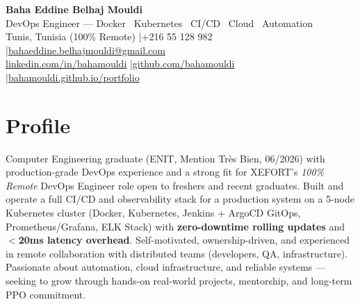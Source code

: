 \documentclass[a4paper,9pt]{article}
\begin{document}
\begin{center}
{\LARGE\bfseries\color{navy} Baha Eddine Belhaj Mouldi}\\[3pt]
{\large DevOps Engineer --- Docker \textbar\ Kubernetes \textbar\ CI/CD \textbar\ Cloud \textbar\ Automation}\\[4pt]
Tunis, Tunisia (100\% Remote) \quad|\quad +216 55 128 982 \quad|\quad \href{mailto:bahaeddine.belhajmouldi@gmail.com}{bahaeddine.belhajmouldi@gmail.com}\\[1pt]
\href{https://www.linkedin.com/in/bahamouldi}{linkedin.com/in/bahamouldi} \quad|\quad \href{https://github.com/bahamouldi}{github.com/bahamouldi} \quad|\quad \href{https://bahamouldi.github.io/portfolio/}{bahamouldi.github.io/portfolio}
\end{center}
\vspace{2pt}
\section{Profile}
Computer Engineering graduate (ENIT, Mention Très Bien, 06/2026) with production-grade DevOps experience and a strong fit for XEFORT's \textit{100\% Remote} DevOps Engineer role open to freshers and recent graduates. Built and operate a full CI/CD and observability stack for a production system on a 5-node Kubernetes cluster (Docker, Kubernetes, Jenkins + ArgoCD GitOps, Prometheus/Grafana, ELK Stack) with \textbf{zero-downtime rolling updates} and \textbf{$<$20ms latency overhead}. Self-motivated, ownership-driven, and experienced in remote collaboration with distributed teams (developers, QA, infrastructure). Passionate about automation, cloud infrastructure, and reliable systems — seeking to grow through hands-on real-world projects, mentorship, and long-term PPO commitment.
\end{document}
